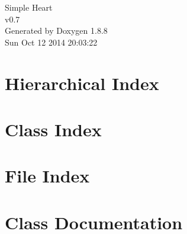 \documentclass[twoside]{book}
\newcommand{\+}{\discretionary{\mbox{\scriptsize$\hookleftarrow$}}{}{}}
\newcommand{\clearemptydoublepage}{%
  \newpage{\pagestyle{empty}\cleardoublepage}%
}
\begin{document}
\hypersetup{pageanchor=false,
             bookmarks=true,
             bookmarksnumbered=true,
             pdfencoding=unicode
            }
\begin{titlepage}
\vspace*{7cm}
\begin{center}%
{\Large Simple Heart \\[1ex]\large v0.\+7 }\\
\vspace*{1cm}
{\large Generated by Doxygen 1.8.8}\\
\vspace*{0.5cm}
{\small Sun Oct 12 2014 20:03:22}\\
\end{center}
\end{titlepage}
\clearemptydoublepage
\tableofcontents
\clearemptydoublepage
{}
\hypersetup{pageanchor=true}

\chapter{Hierarchical Index}

\chapter{Class Index}

\chapter{File Index}

\chapter{Class Documentation}

































\end{document}
